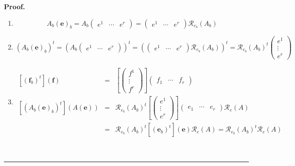 \documentclass[aps,preprint]{revtex4}
\newenvironment{proof}[1][Proof]{\noindent\textbf{#1.} }{\ \rule{0.5em}{0.5em}}
\begin{document}
\begin{proof}
\begin{enumerate}
\item 
\begin{equation}
A_{b}\left( \boldsymbol{e}\right) _{b}=A_{b}\left( 
\begin{array}{ccc}
e^{1} & \cdots & e^{r}%
\end{array}%
\right) =\left( 
\begin{array}{ccc}
e^{1} & \cdots & e^{r}%
\end{array}%
\right) \mathcal{R}_{e_{b}}\left( A_{b}\right)
\end{equation}

\item 
\begin{equation}
\left( A_{b}\left( \boldsymbol{e}\right) _{b}\right) ^{t}=\left( A_{b}\left( 
\begin{array}{ccc}
e^{1} & \cdots & e^{r}%
\end{array}%
\right) \right) ^{t}=\left( \left( 
\begin{array}{ccc}
e^{1} & \cdots & e^{r}%
\end{array}%
\right) \mathcal{R}_{e_{b}}\left( A_{b}\right) \right) ^{t}=\mathcal{R}%
_{e_{b}}\left( A_{b}\right) ^{t}\left( 
\begin{array}{c}
e^{1} \\ 
\vdots \\ 
e^{r}%
\end{array}%
\right)
\end{equation}

\item 
\begin{eqnarray}
\left[ \left( \boldsymbol{f}_{b}\right) ^{t}\right] \left( \boldsymbol{f}%
\right) &=&\left[ \left( 
\begin{array}{c}
f^{1} \\ 
\vdots \\ 
f^{r}%
\end{array}%
\right) \right] \left( 
\begin{array}{ccc}
f_{1} & \cdots & f_{r}%
\end{array}%
\right) \\
\left[ \left( A_{b}\left( \boldsymbol{e}\right) _{b}\right) ^{t}\right]
\left( A\left( \boldsymbol{e}\right) \right) &=&\mathcal{R}_{e_{b}}\left(
A_{b}\right) ^{t}\left[ \left( 
\begin{array}{c}
e^{1} \\ 
\vdots \\ 
e^{r}%
\end{array}%
\right) \right] \left( 
\begin{array}{ccc}
e_{1} & \cdots & e_{r}%
\end{array}%
\right) \mathcal{R}_{e}\left( A\right) \\
&=&\mathcal{R}_{e_{b}}\left( A_{b}\right) ^{t}\left[ \overset{}{\left( 
\boldsymbol{e}_{b}\right) ^{t}}\right] \left( \overset{}{\boldsymbol{e}}%
\right) \mathcal{R}_{e}\left( A\right) =\mathcal{R}_{e_{b}}\left(
A_{b}\right) ^{t}\mathcal{R}_{e}\left( A\right)
\end{eqnarray}


\end{enumerate}
\end{proof}
\end{document}
